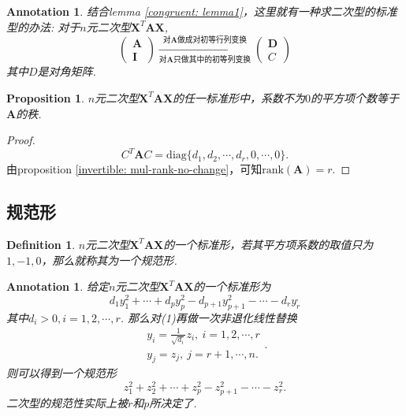 \documentclass{article}
\newtheorem{proposition}[theorem]{Proposition}
\newtheorem{definition}[theorem]{Definition}
\newtheorem{annotation}[theorem]{Annotation}
\newcommand{\mbf}[1]{\bm{#1}}
\newcommand{\rank}[1]{\text{rank}(#1)} %
\begin{document}
\begin{annotation}
\rm 结合lemma \ref{congruent: lemma1}，这里就有一种求二次型的标准型的办法: 对于$n$元二次型$\mbf{X}^T\mbf{A}\mbf{X}$,
$$
\begin{pmatrix}
\mbf{A} \\
\mbf{I}
\end{pmatrix}
\xrightarrow[\text{对$\mbf{A}$只做其中的初等列变换}]{\text{对$\mbf{A}$做成对初等行列变换}}
\begin{pmatrix}
\mbf{D} \\
C
\end{pmatrix}
$$
其中$D$是对角矩阵. 
\end{annotation}

\begin{proposition}
\rm $n$元二次型$\mbf{X}^T\mbf{A}\mbf{X}$的任一标准形中，系数不为$0$的平方项个数等于$\mbf{A}$的秩.
\end{proposition}

\begin{proof}
$$
C^T\mbf{A}C = \text{diag}\{d_1,d_2,\cdots,d_r,0,\cdots,0\}.
$$
由proposition \ref{invertible: mul-rank-no-change}，可知$\rank{\mbf{A}} = r$.
\end{proof}

\newpage
\subsection{规范形}

\begin{definition}
\rm $n$元二次型$\mbf{X}^T\mbf{A}\mbf{X}$的一个标准形，若其平方项系数的取值只为$1,-1,0$，那么就称其为一个{\color{red}规范形}.
\end{definition}

\begin{annotation}
\rm 给定$n$元二次型$\mbf{X}^T\mbf{A}\mbf{X}$的一个标准形为
\begin{equation}
d_1y_1^2 + \cdots + d_py_p^2 - d_{p+1}y_{p+1}^2 - \cdots - d_ry_r^,
\end{equation}
其中$d_i > 0, i = 1,2,\cdots,r$. 那么对(1)再做一次非退化线性替换
$$
\begin{array}{ll}
y_i = \frac{1}{\sqrt{d_i}}z_i, ~i = 1,2,\cdots,r \\
y_j = z_j,~j=r+1,\cdots,n.
\end{array}.
$$ 
则可以得到一个规范形
\begin{equation}
z_1^2 + z_2^2 + \cdots + z_p^2 - z_{p+1}^2 -\cdots - z_{r}^2. 
\end{equation}
二次型的规范性实际上被$r$和$p$所决定了. 
\end{annotation}
\end{document}
